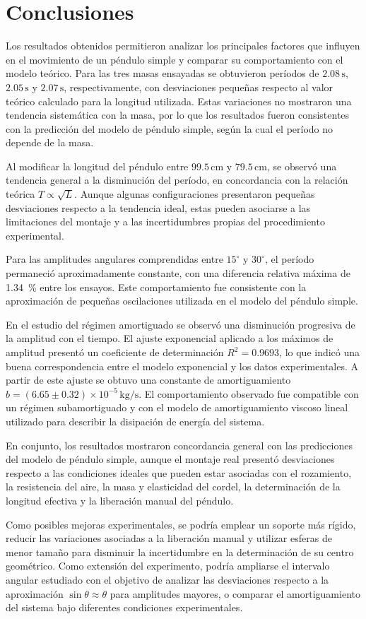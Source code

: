 \section{Conclusiones}

Los resultados obtenidos permitieron analizar los principales factores que influyen en el movimiento de un péndulo simple y comparar su comportamiento con el modelo teórico. Para las tres masas ensayadas se obtuvieron períodos de $2.08\,\mathrm{s}$, $2.05\,\mathrm{s}$ y $2.07\,\mathrm{s}$, respectivamente, con desviaciones pequeñas respecto al valor teórico calculado para la longitud utilizada. Estas variaciones no mostraron una tendencia sistemática con la masa, por lo que los resultados fueron consistentes con la predicción del modelo de péndulo simple, según la cual el período no depende de la masa.

Al modificar la longitud del péndulo entre $99.5\,\mathrm{cm}$ y $79.5\,\mathrm{cm}$, se observó una tendencia general a la disminución del período, en concordancia con la relación teórica $T\propto\sqrt{L}$. Aunque algunas configuraciones presentaron pequeñas desviaciones respecto a la tendencia ideal, estas pueden asociarse a las limitaciones del montaje y a las incertidumbres propias del procedimiento experimental.

Para las amplitudes angulares comprendidas entre $15^\circ$ y $30^\circ$, el período permaneció aproximadamente constante, con una diferencia relativa máxima de \SI{1.34}{\percent} entre los ensayos. Este comportamiento fue consistente con la aproximación de pequeñas oscilaciones utilizada en el modelo del péndulo simple.

En el estudio del régimen amortiguado se observó una disminución progresiva de la amplitud con el tiempo. El ajuste exponencial aplicado a los máximos de amplitud presentó un coeficiente de determinación $R^2=0.9693$, lo que indicó una buena correspondencia entre el modelo exponencial y los datos experimentales. A partir de este ajuste se obtuvo una constante de amortiguamiento $b=(6.65\pm0.32)\times10^{-5}\,\mathrm{kg/s}$. El comportamiento observado fue compatible con un régimen subamortiguado y con el modelo de amortiguamiento viscoso lineal utilizado para describir la disipación de energía del sistema.

En conjunto, los resultados mostraron concordancia general con las predicciones del modelo de péndulo simple, aunque el montaje real presentó desviaciones respecto a las condiciones ideales que pueden estar asociadas con el rozamiento, la resistencia del aire, la masa y elasticidad del cordel, la determinación de la longitud efectiva y la liberación manual del péndulo.

Como posibles mejoras experimentales, se podría emplear un soporte más rígido, reducir las variaciones asociadas a la liberación manual y utilizar esferas de menor tamaño para disminuir la incertidumbre en la determinación de su centro geométrico. Como extensión del experimento, podría ampliarse el intervalo angular estudiado con el objetivo de analizar las desviaciones respecto a la aproximación $\sin\theta\approx\theta$ para amplitudes mayores, o comparar el amortiguamiento del sistema bajo diferentes condiciones experimentales.
